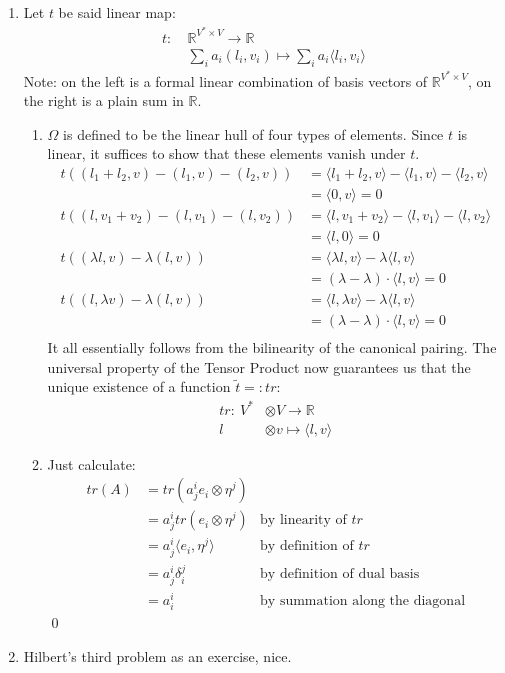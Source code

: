 \documentclass[a4paper,11pt,notitlepage,fullpage]{article}
\begin{document}
\begin{enumerate}
\item Let $t$ be said linear map:
\begin{align*}
t:~ &\mathbb R^{V^*\times V} \to \mathbb R \\
&\sum_i a_i (l_i,v_i) \mapsto \sum_i a_i \langle l_i,v_i\rangle
\end{align*}
Note: on the left is a formal linear combination of basis vectors of $\mathbb R^{V^*\times V}$, on the right is a plain sum in $\mathbb R$.
\begin{enumerate}
\item $\Omega$ is defined to be the linear hull of four types of elements. Since $t$ is linear, it suffices to show that these elements vanish under $t$.
\begin{align*}
t\left(\left(l_1 + l_2, v\right) - \left(l_1, v\right) - \left(l_2, v\right)\right) &=
\langle l_1 + l_2, v\rangle - \langle l_1, v\rangle - \langle l_2, v\rangle \\
&= \langle 0, v \rangle = 0 \\
t\left(\left(l, v_1 + v_2\right) - \left(l, v_1\right) - \left(l, v_2\right)\right) &=
\langle l, v_1 + v_2\rangle - \langle l, v_1\rangle - \langle l, v_2\rangle \\
&= \langle l, 0 \rangle = 0 \\
t\left( \left( \lambda l, v\right) - \lambda \left( l, v\right) \right) &=
\langle \lambda l, v \rangle - \lambda \langle l, v \rangle \\
&= (\lambda - \lambda) \cdot \langle l, v \rangle = 0 \\
t\left( \left( l, \lambda v\right) - \lambda \left( l, v\right) \right) &=
\langle l, \lambda v \rangle - \lambda \langle l, v \rangle \\
&= (\lambda - \lambda) \cdot \langle l, v \rangle = 0 \\
\end{align*}
It all essentially follows from the bilinearity of the canonical pairing. The universal property of the Tensor Product now guarantees us that the unique existence of a function $\tilde t =: tr$:
\begin{align*}
tr:~ V^* &\otimes V \to \mathbb R \\
l &\otimes v \mapsto \langle l, v \rangle
\end{align*}

\item Just calculate:
\begin{align*}
tr(A) &= tr(a_j^i e_i \otimes \eta^j) \\
&= a_j^i tr(e_i \otimes \eta^j) &\text{by linearity of }tr \\
&= a_j^i \langle e_i, \eta^j \rangle &\text{by definition of }tr \\
&= a_j^i \delta_i^j &\text{by definition of dual basis} \\
&= a_i^i &\text{by summation along the diagonal}
\end{align*}
\qed
\end{enumerate}

\item Hilbert's third problem as an exercise, nice. 

\end{enumerate}
\end{document}
